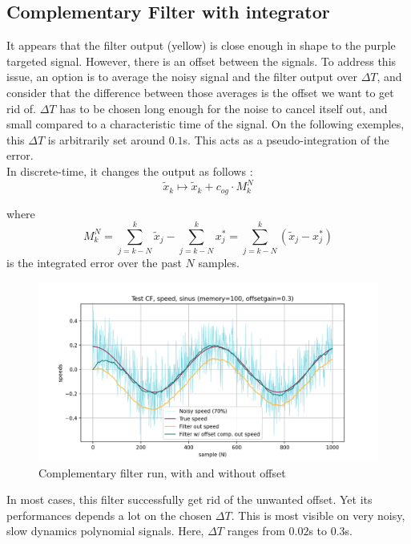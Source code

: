 \documentclass[a4paper,10pt]{article}
\begin{document}
\subsection{Complementary Filter with integrator}
\label{complementary filter integrator}
It appears that the filter output (yellow) is close enough in shape to the purple targeted signal. However, there is an offset between the signals.
To address this issue, an option is to average the noisy signal and the filter output over $\Delta T$, and consider that the difference between those averages is the offset we want to get rid of. $\Delta T$ has to be chosen long enough for the noise to cancel itself out, and small compared to a characteristic time of the signal. On the following exemples, this $\Delta T$ is arbitrarily set around $0.1$s. This acts as a pseudo-integration of the error.\\
In discrete-time, it changes the output as follows :
$$\widetilde{x}_k \mapsto \widetilde{x}_k + c_{og} \cdot M_k^N$$

where $$M_k^N = \sum_{j=k-N}^{k}\widetilde{x}_j - \sum_{j=k-N}^{k}x_j^* = \sum_{j=k-N}^{k}(\widetilde{x}_j - x_j^*) $$
is the integrated error over the past $N$ samples. 


\begin{figure}[H]
\centering
  \includegraphics[width=\linewidth, angle=0, scale=0.8]{./images/TestCF_run8_sinus.png}
  \caption{Complementary filter run, with and without offset}
\end{figure}

In most cases, this filter successfully get rid of the unwanted offset. Yet its performances depends a lot on the chosen $\Delta T$. This is most visible on very noisy, slow dynamics polynomial signals. Here, $\Delta T$ ranges from $0.02$s to $0.3$s.
\end{document}
